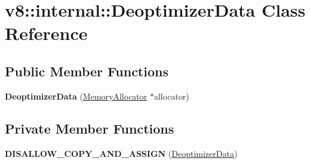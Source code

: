 \hypertarget{classv8_1_1internal_1_1_deoptimizer_data}{}\section{v8\+:\+:internal\+:\+:Deoptimizer\+Data Class Reference}
\label{classv8_1_1internal_1_1_deoptimizer_data}
\subsection*{Public Member Functions}
\begin{DoxyCompactItemize}
\item 
{\bfseries Deoptimizer\+Data} (\hyperlink{classv8_1_1internal_1_1_memory_allocator}{Memory\+Allocator} $\ast$allocator)\hypertarget{classv8_1_1internal_1_1_deoptimizer_data_a498a0e445b21af454871f88b8d6a3a64}{}\label{classv8_1_1internal_1_1_deoptimizer_data_a498a0e445b21af454871f88b8d6a3a64}

\end{DoxyCompactItemize}
\subsection*{Private Member Functions}
\begin{DoxyCompactItemize}
\item 
{\bfseries D\+I\+S\+A\+L\+L\+O\+W\+\_\+\+C\+O\+P\+Y\+\_\+\+A\+N\+D\+\_\+\+A\+S\+S\+I\+GN} (\hyperlink{classv8_1_1internal_1_1_deoptimizer_data}{Deoptimizer\+Data})\hypertarget{classv8_1_1internal_1_1_deoptimizer_data_af7740dac4c34123e28e705637072edc5}{}\label{classv8_1_1internal_1_1_deoptimizer_data_af7740dac4c34123e28e705637072edc5}

\end{DoxyCompactItemize}
